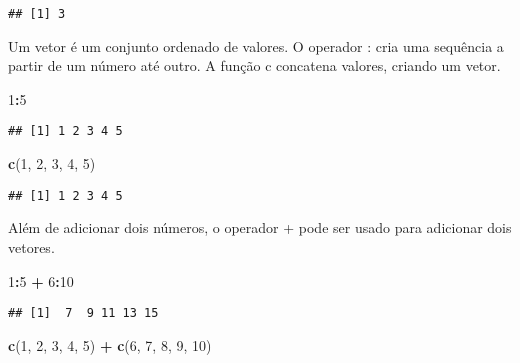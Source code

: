 \documentclass[
]{book}
\newenvironment{Shaded}{\begin{snugshade}}{\end{snugshade}}
\newcommand{\DecValTok}[1]{\textcolor[rgb]{0.00,0.00,0.81}{#1}}
\newcommand{\FunctionTok}[1]{\textcolor[rgb]{0.13,0.29,0.53}{\textbf{#1}}}
\newcommand{\NormalTok}[1]{#1}
\newcommand{\SpecialCharTok}[1]{\textcolor[rgb]{0.81,0.36,0.00}{\textbf{#1}}}
\begin{document}
\begin{verbatim}
## [1] 3
\end{verbatim}

Um vetor é um conjunto ordenado de valores.
O operador : cria uma sequência a partir de um número até outro.
A função c concatena valores, criando um vetor.

\begin{Shaded}
\begin{Highlighting}[]
\DecValTok{1}\SpecialCharTok{:}\DecValTok{5}
\end{Highlighting}
\end{Shaded}

\begin{verbatim}
## [1] 1 2 3 4 5
\end{verbatim}

\begin{Shaded}
\begin{Highlighting}[]
\FunctionTok{c}\NormalTok{(}\DecValTok{1}\NormalTok{, }\DecValTok{2}\NormalTok{, }\DecValTok{3}\NormalTok{, }\DecValTok{4}\NormalTok{, }\DecValTok{5}\NormalTok{)}
\end{Highlighting}
\end{Shaded}

\begin{verbatim}
## [1] 1 2 3 4 5
\end{verbatim}

Além de adicionar dois números, o operador + pode ser usado para adicionar dois vetores.

\begin{Shaded}
\begin{Highlighting}[]
\DecValTok{1}\SpecialCharTok{:}\DecValTok{5} \SpecialCharTok{+} \DecValTok{6}\SpecialCharTok{:}\DecValTok{10}
\end{Highlighting}
\end{Shaded}

\begin{verbatim}
## [1]  7  9 11 13 15
\end{verbatim}

\begin{Shaded}
\begin{Highlighting}[]
\FunctionTok{c}\NormalTok{(}\DecValTok{1}\NormalTok{, }\DecValTok{2}\NormalTok{, }\DecValTok{3}\NormalTok{, }\DecValTok{4}\NormalTok{, }\DecValTok{5}\NormalTok{) }\SpecialCharTok{+} \FunctionTok{c}\NormalTok{(}\DecValTok{6}\NormalTok{, }\DecValTok{7}\NormalTok{, }\DecValTok{8}\NormalTok{, }\DecValTok{9}\NormalTok{, }\DecValTok{10}\NormalTok{)}
\end{Highlighting}
\end{Shaded}
\end{document}
